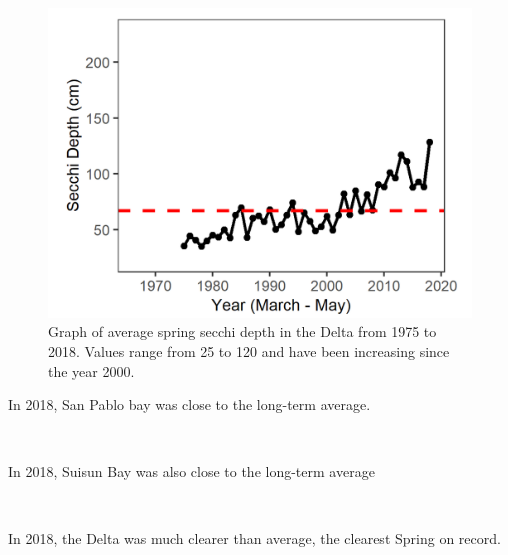\documentclass[
]{book}
\begin{document}
\begin{panel-grid}
\begin{columns-nocenter}
\begin{column800}
\begin{expand}
\begin{figure}
\includegraphics[width=15.25in]{figures/secchi_dtspring} \caption{Graph of average spring secchi depth in the Delta from 1975 to 2018. Values range from 25 to 120 and have been increasing since the year 2000.}\label{fig:unnamed-chunk-10}
\end{figure}

\end{expand}

\end{column800}

\end{columns-nocenter}

\begin{columns-nocenter}

\begin{column800}

In 2018, San Pablo bay was close to the long-term average.

\end{column800}

\begin{column40}

~

\end{column40}

\begin{column800}

In 2018, Suisun Bay was also close to the long-term average

\end{column800}

\begin{column40}

~

\end{column40}

\begin{column800}

In 2018, the Delta was much clearer than average, the clearest Spring on record.

\end{column800}

\end{columns-nocenter}

\end{panel-grid}
\end{document}
